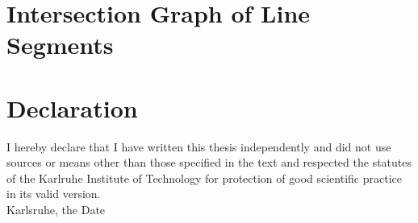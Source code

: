 \documentclass[12pt,a4paper]{scrartcl}
\theoremstyle{plain}
\theoremstyle{definition}
\numberwithin{equation}{section}
\begin{document}
\section{Intersection Graph of Line Segments}

\newpage



\listoffigures
\newpage
 


      

\newpage
  
 \thispagestyle{empty}


\vspace*{8cm}


\section*{Declaration}

I hereby declare that I have written this thesis independently and did not use sources or means other than those specified in the text
 and respected the statutes of the Karlruhe Institute of Technology for protection of good scientific practice in its valid version.
\\[2ex] 





\noindent
Karlsruhe, the Date \\[5ex]

\end{document}
